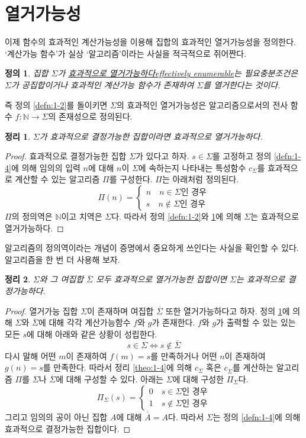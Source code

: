\documentclass[a4paper,chapter,atbegshi]{oblivoir}
\newtheorem{defn}{정의}[chapter]
\newtheorem{theo}{정리}[chapter]
\begin{document}
\section{열거가능성}
이제 함수의 효과적인 계산가능성을 이용해 집합의 효과적인 열거가능성을 정의한다.
`계산가능 함수'가 실상 `알고리즘'이라는 사실을 적극적으로 쥐어짠다.
\begin{defn}\label{defn:1-5}
  집합 $\Sigma$가 \underline{효과적으로 열거가능하다\tiny effectively 
  enumerable}는 필요충분조건은 $\Sigma$가 공집합이거나 
  효과적인 계산가능 함수가 존재하여 $\Sigma$를 열거한다는 것이다.
\end{defn}
즉 정의 \ref{defn:1-2}를 돌이키면 $\Sigma$의 효과적인 열거가능성은
알고리즘으로서의 전사 함수 $f:\mathbb{N}\rightarrow\Sigma$의 존재성으로 정의된다.
\begin{theo}\label{theo:1-5}
  $\Sigma$가 효과적으로 결정가능한 집합이라면 효과적으로 열거가능하다.
\end{theo}
\begin{proof}
  효과적으로 결정가능한 집합 $\Sigma$가 있다고 하자. $s\in\Sigma$를
  고정하고 정의 \ref{defn:1-4}에 의해 임의의 입력 $n$에 대해
  $n$이 $\Sigma$에 속하는지 나타내는 특성함수 $c_{\Sigma}$를
  효과적으로 계산할 수 있는 알고리즘 $\Pi$를 구성한다. $\Pi$는
  아래처럼 정의된다.
  \[
    \Pi(n) = \begin{cases}n\quad n\in\Sigma\textrm{인 경우}\\
    s\quad n\notin\Sigma\textrm{인 경우}\end{cases}
  \]
  $\Pi$의 정의역은 $\mathbb{N}$이고 치역은 $\Sigma$다. 따라서
  정의 \ref{defn:1-2}와 \ref{defn:1-5}에 의해 
  $\Sigma$는 효과적으로 열거가능하다.
\end{proof}
알고리즘의 정의역이라는 개념이 증명에서 중요하게 쓰인다는 사실을
확인할 수 있다. 알고리즘을 한 번 더 사용해 보자. 
\begin{theo}
  $\Sigma$와 그 여집합 $\overline{\Sigma}$ 모두 효과적으로 열거가능한
  집합이면 $\Sigma$는 효과적으로 결정가능하다.
\end{theo}
\begin{proof}
  열거가능 집합 $\Sigma$이 존재하며 여집합 $\overline{\Sigma}$ 또한
  열거가능하다고 하자. 정의 \ref{defn:1-5}에 의해 $\Sigma$와 $\overline{\Sigma}$에
  대해 각각 계산가능함수 $f$와 $g$가 존재한다. $f$와 $g$가 출력할 수 있는
  있는 모든 $s$에 대해 아래와 같은 상황이 성립한다. 
  \[
    s\in\Sigma \iff s\notin\overline{\Sigma} 
  \]
  다시 말해 어떤 $m$이 존재하여 $f(m)=s$를 만족하거나 어떤 $n$이 존재하여
  $g(n)=s$를 만족한다. 따라서 정리 \ref{theo:1-4}에 의해 $c_{\Sigma}$ 혹은
  $c_{\overline{\Sigma}}$를 계산하는 알고리즘 $\Pi$를 $\Sigma$나
  $\overline{\Sigma}$에 대해 구성할 수 있다. 아래는 $\Sigma$에 대해 구성한
  $\Pi_{\Sigma}$다.
  \[
    \Pi_{\Sigma}(s)=
    \begin{cases}
      0\quad s\in\Sigma\textrm{인 경우} \\
      1\quad s\notin\Sigma\textrm{인 경우}
    \end{cases}
  \]
  그리고 임의의 공이 아닌 집합 $A$에 대해 $\overline{\overline{A}}=A$다.
  따라서 $\Sigma$는 정의 \ref{defn:1-4}에 의해 효과적으로 결정가능한 집합이다.
\end{proof}
\end{document}

